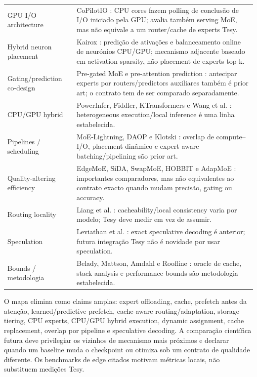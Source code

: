 \begin{tabularx}{\linewidth}{@{}p{31mm}Y@{}}
GPU I/O architecture & CoPilotIO \cite{chen2026copilotio}: CPU cores fazem polling de conclusão de I/O iniciado pela GPU; avalia também serving MoE, mas não equivale a um router/cache de experts Tesy.\\
Hybrid neuron placement & Kairox \cite{jiang2026kairox}: predição de ativações e balanceamento online de neurónios CPU/GPU; mecanismo adjacente baseado em activation sparsity, não placement de experts top-k.\\
Gating/prediction co-design & Pre-gated MoE e pre-attention prediction \cite{hwang2024pregated,zhu2025preattention}: antecipar experts por routers/predictors auxiliares também é prior art; o contrato tem de ser comparado separadamente.\\
CPU/GPU hybrid & PowerInfer, Fiddler, KTransformers e Wang et al. \cite{song2024powerinfer,kamahori2025fiddler,chen2025ktransformers,wang2026localslo}: heterogeneous execution/local inference é uma linha estabelecida.\\
Pipelines / scheduling & MoE-Lightning, DAOP e Klotski \cite{cao2025moelightning,zhang2025daop,fang2025klotski}: overlap de compute--I/O, placement dinâmico e expert-aware batching/pipelining são prior art.\\
Quality-altering efficiency & EdgeMoE, SiDA, SwapMoE, HOBBIT e AdapMoE \cite{yi2023edgemoe,du2024sida,kong2024swapmoe,tang2024hobbit,zhong2024adapmoe}: importantes comparadores, mas não equivalentes ao contrato exacto quando mudam precisão, gating ou accuracy.\\
Routing locality & Liang et al. \cite{liang2026routing}: cacheability/local consistency varia por modelo; Tesy deve medir em vez de assumir.\\
Speculation & Leviathan et al. \cite{leviathan2023speculative}: exact speculative decoding é anterior; futura integração Tesy não é novidade por usar speculation.\\
Bounds / metodologia & Belady, Mattson, Amdahl e Roofline \cite{belady1966replacement,mattson1970storage,amdahl1967validity,williams2009roofline}: oracle de cache, stack analysis e performance bounds são metodologia estabelecida.\\
\bottomrule\end{tabularx}
\normalsize

O mapa elimina como claims amplas: expert offloading, cache, prefetch antes da atenção, learned/predictive prefetch, cache-aware routing/adaptation, storage tiering, CPU experts, CPU/GPU hybrid execution, dynamic assignment, cache replacement, overlap por pipeline e speculative decoding. A comparação científica futura deve privilegiar os vizinhos de mecanismo mais próximos e declarar quando um baseline muda o checkpoint ou otimiza sob um contrato de qualidade diferente. Os benchmarks de edge citados motivam métricas locais, não substituem medições Tesy.
